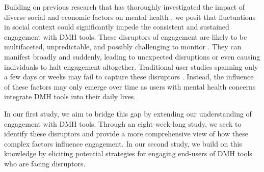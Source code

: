 Building on previous research that has thoroughly investigated the impact of diverse social and economic factors on mental health \cite{slavich2020social, mills2020prioritising, allen2014social}, we posit that fluctuations in social context could significantly impede the consistent and sustained engagement with DMH tools.
These disruptors of engagement are likely to be multifaceted, unpredictable, and possibly challenging to monitor \cite{bhattacharjee2022design, allen2014social, slavich2023social}. They can manifest broadly and suddenly, leading to unexpected disruptions or even causing individuals to halt engagement altogether. Traditional user studies spanning only a few days or weeks may fail to capture these disruptors \cite{bhattacharjee2022design}. Instead, the influence of these factors may only emerge over time as users with mental health concerns integrate DMH tools into their daily lives. 

In our first study, we aim to bridge this gap by extending our understanding of engagement with DMH tools. Through an eight-week-long study, we seek to identify these disruptors and provide a more comprehensive view of how these complex factors influence engagement. In our second study, we build on this knowledge by eliciting potential strategies for engaging end-users of DMH tools who are facing disruptors. 













